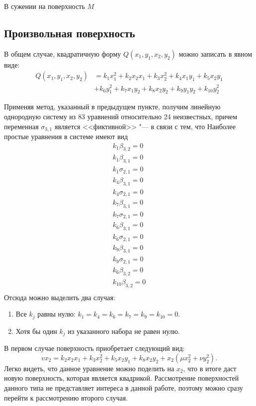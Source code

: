 \documentclass[a4paper,14pt]{extarticle}
\begin{document}
В сужении на поверхность $M$

\subsection{Произвольная поверхность}
В общем случае, квадратичную форму $Q(x_1, y_1, x_2, y_2)$ можно записать в явном виде: 
\begin{align*}
Q(x_1, y_1, x_2, y_2) &= k_1 x_1^2 + k_2 x_2 x_1 + k_3 x_2^2 + k_4 x_1 y_1 + k_5 x_2 y_1 \\
&+ k_6 y_1^2 + k_7 x_1 y_2 + k_8 x_2 y_2 + k_9 y_1 y_2 + k_{10} y_2^2
\end{align*}

Применяя метод, указанный в предыдущем пункте, получим линейную однородную систему из 83 уравнений относительно 24 неизвестных, причем переменная $\sigma_{3,1}$ является <<фиктивной>> "--- в связи с тем, что   Наиболее простые уравнения в системе имеют вид
\begin{equation}
\begin{array}{l}
 k_1 \beta _{3,2}=0 \\
 k_1 \beta _{3,1}=0 \\
 k_1 \sigma _{2,1}=0 \\
 k_4 \beta _{3,1}=0 \\
 k_4 \sigma _{2,1}=0 \\
 k_7 \beta _{3,1}=0 \\
 k_7 \sigma _{2,1}=0 \\
 k_6 \beta _{3,1}=0 \\
 k_6 \sigma _{2,1}=0 \\
 k_9 \beta _{3,1}=0 \\
 k_9 \sigma _{2,1}=0 \\
 k_6 \beta _{3,2}=0 \\
 k_{10} \beta _{3,2}=0 \\
\end{array}
\end{equation}
Отсюда можно выделить два случая:
\begin{enumerate}
	\item Все $k_j$ равны нулю: $k_1 = k_4 = k_6 = k_7 = k_9 = k_{10} = 0$.
	\item Хотя бы один $k_j$ из указанного набора не равен нулю.
\end{enumerate}
В первом случае поверхность приобретает следующий вид:
\begin{equation*}
v x_2 = k_2 x_2 x_1 + k_3 x_2^2 + k_5 x_2 y_1 + k_8 x_2 y_2 + x_2 (\mu x_2^2 + \nu y_2^2).
\end{equation*}
Легко видеть, что данное уравнение можно поделить на $x_2$, что в итоге даст новую поверхность, которая является квадрикой. Рассмотрение поверхностей данного типа не представляет интереса в данной работе, поэтому можно сразу перейти к рассмотрению второго случая.
\end{document}

